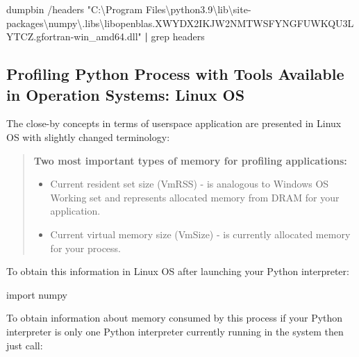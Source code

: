 \documentclass[
]{article}
\newenvironment{Shaded}{}{}
\newcommand{\ExtensionTok}[1]{#1}
\newcommand{\FunctionTok}[1]{\textcolor[rgb]{0.02,0.16,0.49}{#1}}
\newcommand{\ImportTok}[1]{#1}
\newcommand{\KeywordTok}[1]{\textcolor[rgb]{0.00,0.44,0.13}{\textbf{#1}}}
\newcommand{\NormalTok}[1]{#1}
\newcommand{\StringTok}[1]{\textcolor[rgb]{0.25,0.44,0.63}{#1}}
\begin{document}
\begin{itemize}
\begin{Shaded}
\begin{Highlighting}[]
\ExtensionTok{dumpbin}\NormalTok{ /headers }\StringTok{"C:\textbackslash{}Program Files\textbackslash{}python3.9\textbackslash{}lib\textbackslash{}site{-}packages\textbackslash{}numpy\textbackslash{}.libs\textbackslash{}libopenblas.XWYDX2IKJW2NMTWSFYNGFUWKQU3LYTCZ.gfortran{-}win\_amd64.dll"} \KeywordTok{|} \FunctionTok{grep}\NormalTok{ headers}
\end{Highlighting}
\end{Shaded}
\end{itemize}

\hypertarget{profiling-python-process-with-tools-available-in-operation-systems-linux-os}{%
\subsection{Profiling Python Process with Tools Available in Operation
Systems: Linux
OS}\label{profiling-python-process-with-tools-available-in-operation-systems-linux-os}}

The close-by concepts in terms of userspace application are presented in
Linux OS with slightly changed terminology:

\begin{quote}
\textbf{Two most important types of memory for profiling applications:}

\begin{itemize}
\item
  Current resident set size (VmRSS) - is analogous to Windows OS Working
  set and represents allocated memory from DRAM for your application.
\item
  Current virtual memory size (VmSize) - is currently allocated memory
  for your process.
\end{itemize}
\end{quote}

To obtain this information in Linux OS after launching your Python
interpreter:

\begin{Shaded}
\begin{Highlighting}[]
\ImportTok{import}\NormalTok{ numpy}
\end{Highlighting}
\end{Shaded}

To obtain information about memory consumed by this process if your
Python interpreter is only one Python interpreter currently running in
the system then just call:
\end{document}
